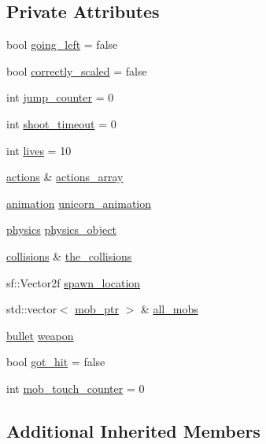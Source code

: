 \subsection*{Private Attributes}
\begin{DoxyCompactItemize}
\item 
bool \hyperlink{classunicorn_a4a032891da1aa855b0b46c6e0b969a35}{going\+\_\+left} = false
\item 
bool \hyperlink{classunicorn_ac427ce120e919fe962664585903328af}{correctly\+\_\+scaled} = false
\item 
int \hyperlink{classunicorn_a7f4c9e68841d896da696132113602019}{jump\+\_\+counter} = 0
\item 
int \hyperlink{classunicorn_a7673cbdfe14f719f710df4b324f74484}{shoot\+\_\+timeout} = 0
\item 
int \hyperlink{classunicorn_ab0462e46c2393f0bc0f5b2faa0b7b091}{lives} = 10
\item 
\hyperlink{drawable_8hpp_a38f93e4749e0d65d51360c429766d212}{actions} \& \hyperlink{classunicorn_a1cc767e234ec6d55ca0b576747f8d7d7}{actions\+\_\+array}
\item 
\hyperlink{classanimation}{animation} \hyperlink{classunicorn_a0d6df4ae413adcf9307c2f36e9c1d51b}{unicorn\+\_\+animation}
\item 
\hyperlink{classphysics}{physics} \hyperlink{classunicorn_accaf554299ce27905fa8c47f602b0e98}{physics\+\_\+object}
\item 
\hyperlink{drawable_8hpp_a7e1a7f34f6d09dabb4cdafd6e4118603}{collisions} \& \hyperlink{classunicorn_a77b6bd58d4bd308c55a530c50fdcce41}{the\+\_\+collisions}
\item 
sf\+::\+Vector2f \hyperlink{classunicorn_ab16638b1ce0d1a7a0da9ecffc6370e8c}{spawn\+\_\+location}
\item 
std\+::vector$<$ \hyperlink{npc_8hpp_a09ee7f853fc9bc830a9445a06fd53d4b}{mob\+\_\+ptr} $>$ \& \hyperlink{classunicorn_aac73bd105ef4ee4c7d46727a7e832bcf}{all\+\_\+mobs}
\item 
\hyperlink{classbullet}{bullet} \hyperlink{classunicorn_a3e51a9e196533b27304f21eb26d8f4ba}{weapon}
\item 
bool \hyperlink{classunicorn_ab808840ba1e83cb34c691ba2472d6f9b}{got\+\_\+hit} = false
\item 
int \hyperlink{classunicorn_ac0762399be7cd26263456d86fd2774ff}{mob\+\_\+touch\+\_\+counter} = 0
\end{DoxyCompactItemize}
\subsection*{Additional Inherited Members}


